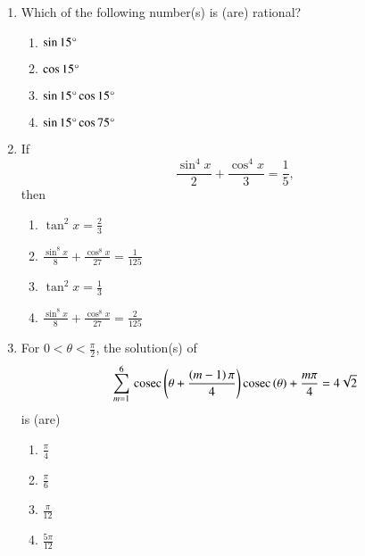 \begin{enumerate}[label=\thesubsection.\arabic*,ref=\thesubsection.\theenumi]
\item Which of the following number(s) is (are) rational? \hfill{} 
\begin{multicols}{4}
\begin{enumerate}
    \item $\sin{15}\degree$
    \item $\cos{15}\degree$
    \item $\sin{15}\degree \cos{15}\degree$
    \item $\sin{15}\degree \cos{75}\degree$
\end{enumerate}
\end{multicols}
\item If $$\frac{\sin^4{x}}{2}+\frac{\cos^4{x}}{3}=\frac{1}{5},$$ then \hfill{} 
\begin{multicols}{2}
\begin{enumerate}
    \item $\tan^2{x}=\frac{2}{3}$
    \item $\frac{\sin^8{x}}{8}+\frac{\cos^8{x}}{27}=\frac{1}{125}$
    \item $\tan^2{x}=\frac{1}{3}$
    \item $\frac{\sin^8{x}}{8}+\frac{\cos^8{x}}{27}=\frac{2}{125}$
\end{enumerate}
\end{multicols}
\item For $ 0<\theta <\frac{\pi}{2}$, the solution(s) of $$\sum_{m=1}^{6}\,\text{cosec}\,{\left(\theta+\frac{\left(m-1\right)\pi}{4}\right)}\,\text{cosec}\,{{\left(\theta\right)+\frac{m\pi}{4}} }= 4\sqrt{2}$$ is (are) \hfill{}
\begin{multicols}{4}
\begin{enumerate}
    \item $\frac{\pi}{4}$
    \item $\frac{\pi}{6}$
    \item $\frac{\pi}{12}$
    \item $\frac{5\pi}{12}$
\end{enumerate}
\end{multicols}


\end{enumerate}

